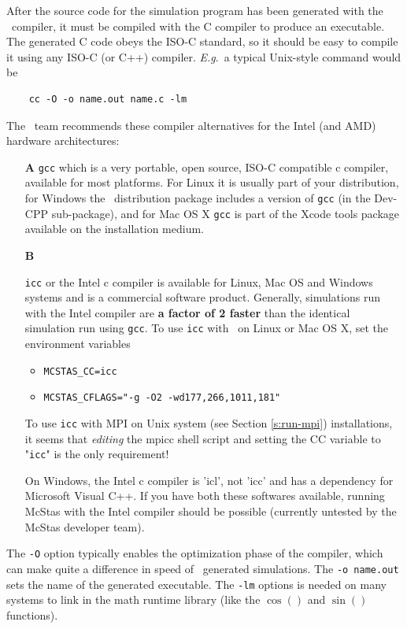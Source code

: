 After the source code for the simulation program has been generated with the
\MCS\ compiler, it must be compiled with the C compiler to produce an
executable. The generated C code obeys the ISO-C standard, so it should be easy
to compile it using any ISO-C (or C++) compiler. \textit{E.g}.\ a typical
Unix-style command would be
\begin{verbatim}
    cc -O -o name.out name.c -lm
\end{verbatim}
The \MCS\ team recommends these compiler alternatives for the Intel (and AMD)
hardware architectures:
\begin{itemize}
\item[\bf A]{\verb+gcc+ which is a very portable, open source, ISO-C compatible
    c compiler, available for most platforms. For Linux it is usually part of
    your distribution, for Windows the \MCS\ distribution package includes a
    version of \verb+gcc+ (in the Dev-CPP sub-package), and for Mac OS X
    \verb+gcc+ is part of the Xcode tools package available on the installation
    medium.}
\item[\bf B]{\verb+icc+ or the Intel c compiler is available for Linux, Mac OS
    and Windows systems and is a commercial software product. Generally,
    simulations run with the Intel compiler are {\bf a factor of 2 faster} than
    the identical simulation run using \verb+gcc+. To use \verb+icc+ with \MCS\
    on Linux or Mac OS X, set the environment variables
    \begin{itemize}
      \item{\verb+MCSTAS_CC=icc+}
      \item{\verb+MCSTAS_CFLAGS="-g -O2 -wd177,266,1011,181"+}
    \end{itemize}
    To use \verb+icc+ with MPI on Unix system (see Section \ref{s:run-mpi})
 installations, it seems that \emph{editing}
    the mpicc shell script and setting the CC variable to "\verb+icc+" is the
    only requirement!}
  On Windows, the Intel c compiler is 'icl', not 'icc' and has a dependency for
  Microsoft Visual C++. If you have both these softwares available, running
  McStas with the Intel compiler should be possible (currently untested by the
  McStas developer team).

\end{itemize}


The \verb+-O+ option typically enables the optimization phase of the compiler,
which can make quite a difference in speed of \MCS\ generated simulations. The
\verb+-o name.out+ sets the name of the generated executable. The \verb+-lm+
options is needed on many systems to link in the math runtime library (like the
$\cos()$ and $\sin()$ functions). \index{Simulation optimization}

